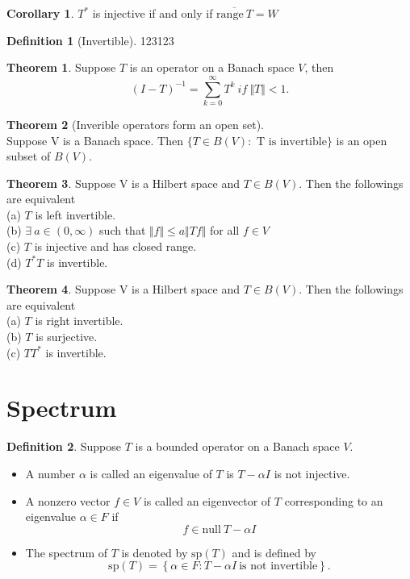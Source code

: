 \documentclass[12pt]{book}
\theoremstyle{definition}
\newtheorem{definition}{Definition}[chapter]
\newtheorem{theorem}{Theorem}[chapter]
\newtheorem{corollary}{Corollary}[section]
\begin{document}
\begin{corollary}
$T^*$ is injective if and only if $\overline{\mathrm{range} \ T}=W$
\end{corollary}

\begin{definition}[Invertible]
123123
\end{definition}

\begin{theorem}Suppose $T$ is an operator on a Banach space $V$, then 
$$
(I-T)^{-1}=\sum_{k=0}^{\infty}T^k \ if \  \Vert T \Vert < 1.
$$
\end{theorem}

\begin{theorem}[Inverible operators form an open set] \ \\
Suppose V is a Banach space. Then $\{T\in B(V):\text{ T is invertible}\}$ is an open subset of $B(V)$.

	
\end{theorem}


\begin{theorem}
Suppose V is a Hilbert space and $T\in B(V)$. Then the followings are equivalent
\\
(a) $T$	is left invertible. \\
(b) $\exists \ a \in (0,\infty)$ such that $\Vert f \Vert \le a \Vert Tf \Vert$ for all $f\in V$ \\
(c) $T$ is injective and has closed range. \\
(d) $T^*T$ is invertible.
\end{theorem}



\begin{theorem}
Suppose V is a Hilbert space and $T\in B(V)$. Then the followings are equivalent
\\
(a) $T$ is right invertible. \\
(b) $T$ is surjective.  \\
(c) $TT^*$ is invertible.
\end{theorem}

\section{Spectrum}
\begin{definition}Suppose $T$ is a bounded operator on a Banach space $V$.
\begin{itemize}
	\item A number $\alpha$ is called an eigenvalue of $T$ is $T-\alpha I$ is not injective.
	\item A nonzero vector $f\in V$ is called an eigenvector of $T$ corresponding to an eigenvalue $\alpha \in F$ if $$ f \in \mathrm{null}\ T-\alpha I$$
	\item The spectrum of $T$ is denoted by $\mathrm{sp}(T)$ and is defined by
$$
\mathrm{sp}(T) = \left\{ \alpha \in F: T-\alpha I \ \text{is not invertible}\right\}.
$$
\end{itemize}
	\end{definition}
\end{document}

